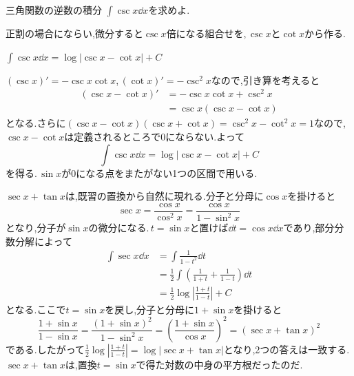 \begin{example}{三角関数の逆数の積分}
$\int\csc x\dd x$を求めよ.
\end{example}

正割の場合にならい,微分すると$\csc x$倍になる組合せを,\,$\csc x$と$\cot x$から作る.

$\int\csc x\dd x=\log|\csc x-\cot x|+C$

$(\csc x)'=-\csc x\cot x$,\,$(\cot x)'=-\csc^2x$なので,引き算を考えると
\begin{align*}
(\csc x-\cot x)'
&=-\csc x\cot x+\csc^2x\\
&=\csc x(\csc x-\cot x)
\end{align*}
となる.さらに$(\csc x-\cot x)(\csc x+\cot x)=\csc^2x-\cot^2x=1$なので,\,$\csc x-\cot x$は定義されるところで$0$にならない.よって
\[
\int\csc x\dd x=\log|\csc x-\cot x|+C
\]
を得る.\,$\sin x$が$0$になる点をまたがない1つの区間で用いる.

$\sec x+\tan x$は,既習の置換から自然に現れる.分子と分母に$\cos x$を掛けると
\[
\sec x=\frac{\cos x}{\cos^2x}=\frac{\cos x}{1-\sin^2x}
\]
となり,分子が$\sin x$の微分になる.\,$t=\sin x$と置けば$\dd t=\cos x\dd x$であり,部分分数分解によって
\begin{align*}
\int\sec x\dd x
&=\int\frac{1}{1-t^2}\dd t\\
&=\frac12\int\left(\frac1{1+t}+\frac1{1-t}\right)\dd t\\
&=\frac12\log\left|\frac{1+t}{1-t}\right|+C
\end{align*}
となる.ここで$t=\sin x$を戻し,分子と分母に$1+\sin x$を掛けると
\[
\frac{1+\sin x}{1-\sin x}
=\frac{(1+\sin x)^2}{1-\sin^2x}
=\left(\frac{1+\sin x}{\cos x}\right)^2
=(\sec x+\tan x)^2
\]
である.したがって$\frac12\log\left|\frac{1+t}{1-t}\right|=\log|\sec x+\tan x|$となり,2つの答えは一致する.\,$\sec x+\tan x$は,置換$t=\sin x$で得た対数の中身の平方根だったのだ.
